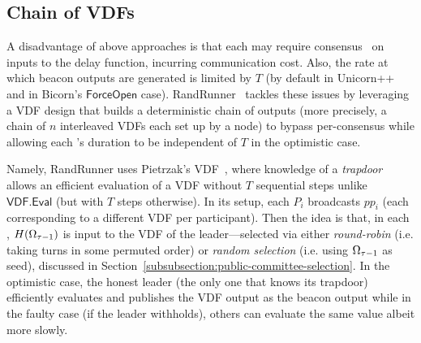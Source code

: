 \subsection{Chain of VDFs}
\label{subsection:randrunner}
A disadvantage of above approaches is that each \epoch may require consensus~\cite{castro1999practical} on inputs to the delay function, incurring communication cost.
Also, the rate at which beacon outputs are generated is limited by $T$ (by default in Unicorn++ and in Bicorn's $\mathsf{ForceOpen}$ case).
RandRunner~\cite{schindler2021randrunner} tackles these issues by leveraging a VDF design that builds a deterministic chain of outputs (more precisely, a chain of $n$ interleaved VDFs each set up by a node) to bypass per-\epoch consensus while allowing each \epoch's duration to be independent of $T$ in the optimistic case.


Namely, RandRunner uses Pietrzak's VDF~\cite{pietrzak2018simple}, where knowledge of a \textit{trapdoor} allows an efficient evaluation of a VDF without $T$ sequential steps unlike $\mathsf{VDF.Eval}$ (but with $T$ steps otherwise).
In its setup, each $P_i$ broadcasts $pp_i$ (each corresponding to a different VDF per participant).
Then the idea is that, in each \epoch, $H(\Omega_{\tau - 1})$ is input to the VDF of the \epoch leader---selected via either \textit{round-robin} (i.e. taking turns in some permuted order) or \textit{random selection} (i.e. using $\Omega_{\tau - 1}$ as seed), discussed in Section~\ref{subsubsection:public-committee-selection}.
In the optimistic case, the honest leader (the only one that knows its trapdoor) efficiently evaluates and publishes the VDF output as the beacon output while in the faulty case (if the leader withholds), others can evaluate the same value albeit more slowly.

